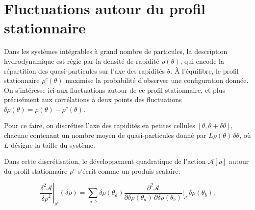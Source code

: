 {%




}

\section{Fluctuations autour du profil stationnaire}

Dans les systèmes intégrables à grand nombre de particules, la description hydrodynamique est régie par la densité de rapidité \( \rho(\theta) \), qui encode la répartition des quasi-particules sur l’axe des rapidités \( \theta \). À l'équilibre, le profil stationnaire \( \rho^c(\theta) \) maximise la probabilité d’observer une configuration donnée. On s’intéresse ici aux fluctuations autour de ce profil stationnaire, et plus précisément aux corrélations à deux points des fluctuations \( \delta \rho(\theta) = \rho(\theta) - \rho^c(\theta) \).

Pour ce faire, on discrétise l’axe des rapidités en petites cellules \( [\theta, \theta + \delta\theta] \), chacune contenant un nombre moyen de quasi-particules donné par \( L \rho(\theta) \, \delta\theta \), où \( L \) désigne la taille du système. 

Dans cette discrétisation, le développement quadratique de l’action \( \mathcal{A}[\rho] \) autour du profil stationnaire \( \rho^c \) s’écrit comme un produis scalaire:

\begin{equation*}
    \left. \frac{\delta^2 \mathcal{A}}{{\delta \rho}^2} \right|_{\rho^c}(\delta \rho ) =  
    \sum_{a,b} \delta \rho(\theta_a)  
    \frac{\partial^2 \mathcal{A}}{\partial \delta \rho(\theta_a) \, \partial \delta \rho(\theta_b)} \Big|_{\rho^c} 
    \delta \rho(\theta_b).
\end{equation*}

